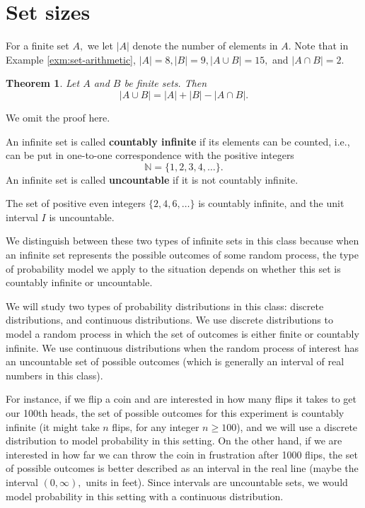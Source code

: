 \documentclass[
]{book}
\newtheorem{theorem}{Theorem}[chapter]
\theoremstyle{definition}
\theoremstyle{definition}
\theoremstyle{definition}
\theoremstyle{definition}
\theoremstyle{remark}
\begin{document}
\section{Set sizes}\label{size-of-sets}

For a finite set \(A,\) we let \(|A|\) denote the number of elements in \(A\).
Note that in Example \ref{exm:set-arithmetic}, \(|A| = 8, |B| = 9, |A \cup B| = 15,\) and \(|A \cap B| = 2\).

\begin{theorem}
\protect\hypertarget{thm:AuB-size}{}\label{thm:AuB-size}Let \(A\) and \(B\) be finite sets. Then \[|A \cup B| = |A| + |B| - |A \cap B|.\]
\end{theorem}

We omit the proof here.

An infinite set is called \textbf{countably infinite} if its elements can be counted, i.e., can be put in one-to-one correspondence with the positive integers \[\mathbb{N} = \{1, 2, 3, 4, \ldots\}.\] An infinite set is called \textbf{uncountable} if it is not countably infinite.

The set of positive even integers \(\{2, 4, 6, \ldots \}\) is countably infinite, and the unit interval \(I\) is uncountable.

We distinguish between these two types of infinite sets in this class because when an infinite set represents the possible outcomes of some random process, the type of probability model we apply to the situation depends on whether this set is countably infinite or uncountable.

We will study two types of probability distributions in this class: discrete distributions, and continuous distributions. We use discrete distributions to model a random process in which the set of outcomes is either finite or countably infinite. We use continuous distributions when the random process of interest has an uncountable set of possible outcomes (which is generally an interval of real numbers in this class).

For instance, if we flip a coin and are interested in how many flips it takes to get our 100th heads, the set of possible outcomes for this experiment is countably infinite (it might take \(n\) flips, for any integer \(n \geq 100\)), and we will use a discrete distribution to model probability in this setting. On the other hand, if we are interested in how far we can throw the coin in frustration after 1000 flips, the set of possible outcomes is better described as an interval in the real line (maybe the interval \((0,\infty),\) units in feet). Since intervals are uncountable sets, we would model probability in this setting with a continuous distribution.
\end{document}
